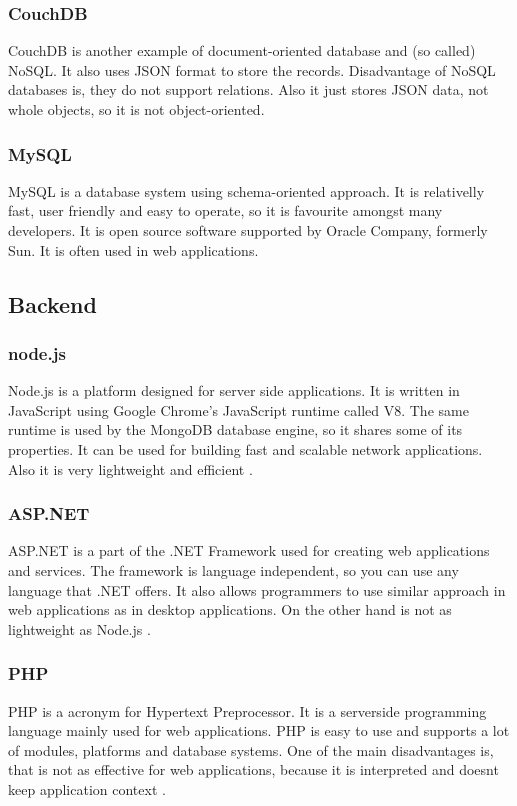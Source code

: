 \subsubsection*{CouchDB}
CouchDB is another example of document-oriented database and (so called) NoSQL. It also uses JSON format to store the records. Disadvantage of NoSQL databases is, they do not support relations. Also it just stores JSON data, not whole objects, so it is not object-oriented.
\cite{couchdb-about, couchdb-technical}

\subsubsection*{MySQL}
MySQL is a database system using schema-oriented approach. It is relativelly fast, user friendly and easy to operate, so it is favourite amongst many developers.
It is open source software supported by Oracle Company, formerly Sun. It is often used in web applications.
\cite{mysql-about}


\subsection{Backend}
\subsubsection*{node.js}
Node.js is a platform designed for server side applications. It is written in JavaScript using Google Chrome's JavaScript runtime called V8. The same runtime is used by the MongoDB database engine, so it shares some of its properties. It can be used for building fast and scalable network applications. Also it is very lightweight and efficient \cite{nodejs-about}.

\subsubsection*{ASP.NET}
ASP.NET is a part of the .NET Framework used for creating web applications and services. The framework is language independent, so you can use any language that .NET offers. It also allows programmers to use similar approach in web applications as in desktop applications. On the other hand is not as lightweight as Node.js \cite{aspnet-about}.

\subsubsection*{PHP}
PHP is a acronym for Hypertext Preprocessor. It is a serverside programming language mainly used for web applications. PHP is easy to use and supports a lot of modules, platforms and database systems. One of the main disadvantages is, that is not as effective for web applications, because it is interpreted and doesnt keep application context \cite{php-whatis}.

